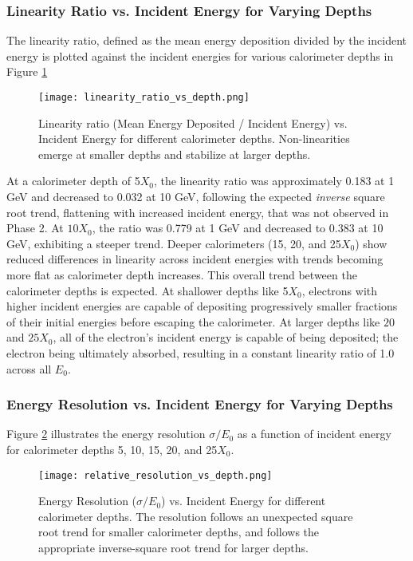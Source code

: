 \documentclass[twocolumn]{aastex631}
\begin{document}
\subsubsection{Linearity Ratio vs. Incident Energy for Varying Depths} 

The linearity ratio, defined as the mean energy deposition divided by the
incident energy is plotted against the incident energies for various calorimeter
depths in Figure \ref{fig:e_2} 

\begin{figure}[htp]
  \centering
    \texttt{[image: linearity\_ratio\_vs\_depth.png]}
    \caption{Linearity ratio (Mean Energy Deposited / Incident Energy) vs.
    Incident Energy for different calorimeter depths. Non-linearities emerge at
smaller depths and stabilize at larger depths.}
\label{fig:e_2}
\end{figure}

At a calorimeter depth of 5$X_0$, the linearity  ratio was approximately 0.183 at 1 GeV and
decreased to 0.032 at 10 GeV, following the expected \textit{inverse} square
root trend, flattening with increased incident energy, that was not observed in
Phase 2. At $10X_0$, the ratio was 0.779 at 1 GeV and decreased to 0.383 at 10
GeV, exhibiting a steeper trend. Deeper calorimeters (15, 20, and 25$X_0$) show
reduced differences in linearity across incident energies with trends becoming
more flat as calorimeter depth increases. This overall trend between the
calorimeter depths is expected. At shallower depths like 5$X_0$, electrons
with higher incident energies are capable of depositing progressively smaller fractions of their
initial energies before escaping the calorimeter. At larger depths like $20$ and
 $25X_0$, all of the electron's incident energy is capable of being deposited;
 the electron being ultimately absorbed, resulting in a constant linearity ratio
 of 1.0 across all $E_0$. 

 \subsubsection{Energy Resolution vs. Incident Energy for Varying Depths}

 Figure \ref{fig:e_3} illustrates the energy resolution $\sigma / E_0$ as a function of
 incident energy for calorimeter depths 5, 10, 15, 20, and 25$X_0$. 

 \begin{figure}[htp]
   \centering
     \texttt{[image: relative\_resolution\_vs\_depth.png]}
     \caption{Energy Resolution ($\sigma/E_0$) vs. Incident Energy for different
         calorimeter depths. The resolution follows an unexpected square root
         trend for smaller
         calorimeter depths, and follows the appropriate inverse-square root trend for
     larger depths.}
         \label{fig:e_3} 
 \end{figure}
\end{document}

